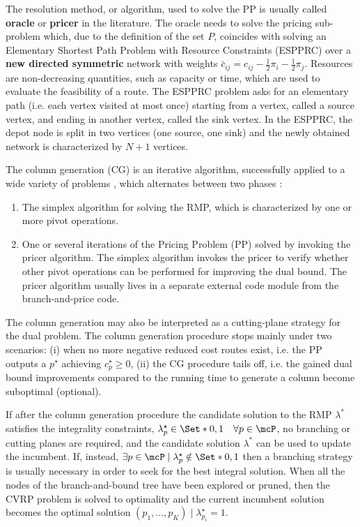 \medskip

The resolution method, or algorithm,
used to solve the PP is usually called \textbf{oracle} or \textbf{pricer} in the literature.
The oracle needs to solve the pricing sub-problem which, due to the definition of the set $P$,
coincides with solving an Elementary Shortest Path Problem with Resource Constraints (ESPPRC)
over a \textbf{new directed symmetric} network with weights
$\bar{c}_{ij} = c_{ij} - \frac{1}{2} \pi_i - \frac{1}{2} \pi_j$.
Resources are non-decreasing quantities,
such as capacity or time,
which are used to evaluate
the feasibility of a route.
The ESPPRC problem asks for an elementary path (i.e. each vertex visited at most once) starting
from a vertex, called a source vertex, and ending in another vertex, called the sink vertex.
In the ESPPRC, the depot node is split in two vertices (one source, one sink)
and the newly obtained network is characterized by $N + 1$ vertices.

\medskip

The column generation (CG) is an iterative algorithm,
successfully applied to a wide variety of problems \parencite{desrosiers2005},
which alternates between two phases \parencite{desaulniers2018}:
\begin{enumerate}
	\setlength{\itemsep}{0pt}
	\setlength{\parskip}{0pt}

	\item The simplex algorithm for solving the RMP, which is characterized by one or more pivot operations.
	\item One or several iterations of the Pricing Problem (PP) solved by invoking the pricer algorithm.
	      The simplex algorithm invokes the pricer to verify whether other pivot operations
	      can be performed for improving the dual bound.
	      The pricer algorithm usually lives in a separate external code module from the branch-and-price code.
\end{enumerate}

The column generation may also be interpreted as a cutting-plane strategy
for the dual problem.
The column generation procedure stops mainly under two scenarios:
(i) when no more negative reduced cost routes exist,
i.e. the PP outputs a $p^\star$ achieving $c^\star_p \ge 0$,
(ii) the CG procedure tails off,
i.e. the gained dual bound improvements
compared to the running time to generate a column
become suboptimal (optional).

If after the column generation procedure
the candidate solution to the RMP $\lambda^*$ satisfies the integrality constraints,
$\lambda^\star_p \in \Set*{0, 1} \quad \forall p \in \mcP$,
no branching or cutting planes are required,
and the candidate solution $\lambda^*$ can be used to update the incumbent.
If, instead,
$\exists p \in \mcP \mid \lambda^\star_p \notin \Set*{0, 1}$
then a branching strategy is usually necessary
in order to seek for the best integral solution.
When all the nodes of the branch-and-bound tree have been explored or pruned,
then the CVRP problem is solved to optimality
and the current incumbent solution becomes the optimal solution
$(p_1, \dots, p_K) \mid \lambda^\star_{p_i} = 1$.

